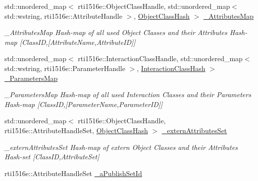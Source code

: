 \begin{DoxyCompactItemize}
std\+::unordered\+\_\+map$<$ rti1516e\+::\+Object\+Class\+Handle, std\+::unordered\+\_\+map$<$ std\+::wstring, rti1516e\+::\+Attribute\+Handle $>$, \hyperlink{structUPIM_1_1UPIMFederate_1_1ObjectClassHash}{Object\+Class\+Hash} $>$ \hyperlink{classUPIM_1_1UPIMFederate_a091bc55d16ccbd8cde510a663a73e8e3}{\+\_\+\+Attributes\+Map}
\begin{DoxyCompactList}\small\item\em \+\_\+\+Attributes\+Map Hash-\/map of all used Object Classes and their Attributes Hash-\/map \mbox{[}Class\+ID,\mbox{[}Attribute\+Name,Attribute\+ID\mbox{]}\mbox{]} \end{DoxyCompactList}\item 
\mbox{\label{classUPIM_1_1UPIMFederate_abe17510116a33c71a42c685d8ef91160}} 
std\+::unordered\+\_\+map$<$ rti1516e\+::\+Interaction\+Class\+Handle, std\+::unordered\+\_\+map$<$ std\+::wstring, rti1516e\+::\+Parameter\+Handle $>$, \hyperlink{structUPIM_1_1UPIMFederate_1_1InteractionClassHash}{Interaction\+Class\+Hash} $>$ \hyperlink{classUPIM_1_1UPIMFederate_abe17510116a33c71a42c685d8ef91160}{\+\_\+\+Parameters\+Map}
\begin{DoxyCompactList}\small\item\em \+\_\+\+Parameters\+Map Hash-\/map of all used Interaction Classes and their Parameters Hash-\/map \mbox{[}Class\+ID,\mbox{[}Parameter\+Name,Parameter\+ID\mbox{]}\mbox{]} \end{DoxyCompactList}\item 
\mbox{\label{classUPIM_1_1UPIMFederate_a746ba76752bf98bf2abc46dbaab7ab3e}} 
std\+::unordered\+\_\+map$<$ rti1516e\+::\+Object\+Class\+Handle, rti1516e\+::\+Attribute\+Handle\+Set, \hyperlink{structUPIM_1_1UPIMFederate_1_1ObjectClassHash}{Object\+Class\+Hash} $>$ \hyperlink{classUPIM_1_1UPIMFederate_a746ba76752bf98bf2abc46dbaab7ab3e}{\+\_\+extern\+Attributes\+Set}
\begin{DoxyCompactList}\small\item\em \+\_\+extern\+Attributes\+Set Hash-\/map of extern Object Classes and their Attributes Hash-\/set \mbox{[}Class\+ID,Attribute\+Set\mbox{]} \end{DoxyCompactList}\item 
\mbox{\label{classUPIM_1_1UPIMFederate_a5340fe9961ecc0be1d39b29f7676120b}} 
rti1516e\+::\+Attribute\+Handle\+Set \hyperlink{classUPIM_1_1UPIMFederate_a5340fe9961ecc0be1d39b29f7676120b}{\+\_\+a\+Publish\+Set\+Id}

\end{DoxyCompactItemize}

